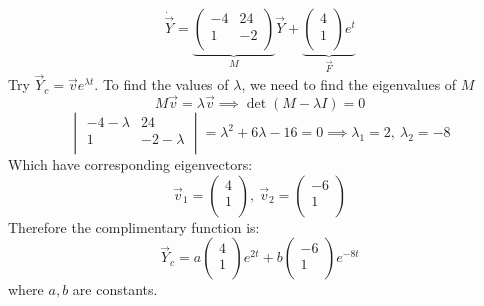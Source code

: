 \documentclass[../main.tex]{subfiles}
\begin{document}
\begin{example}
  \[
    \dot{\vec{Y}} = \underbrace{
      \begin{pmatrix}
        -4 & 24 \\
        1 & -2 \\
      \end{pmatrix}}_{M} \vec{Y} +
    \underbrace{
      \begin{pmatrix}
        4 \\
        1 \\
      \end{pmatrix}e^{t}}_{\vec{F}}
  \]
  Try $\vec{Y}_c = \vec{v} e^{\lambda t}$.
  To find the values of $\lambda$, we need to find the eigenvalues of $M$
  \[
    M \vec{v} = \lambda \vec{v} \implies \det (M -\lambda I) = 0
  \]
  \[
    \begin{vmatrix}
    -4 - \lambda & 24 \\
    1 &  -2 - \lambda \\
    \end{vmatrix} =
    \lambda^2 + 6\lambda - 16 = 0 \implies \lambda_1 = 2,\ \lambda_2 = -8
  \]
  Which have corresponding eigenvectors:
  \[
    \vec{v}_1 = \begin{pmatrix}
    4 \\
    1 \\
    \end{pmatrix},\
    \vec{v}_2 = \begin{pmatrix}
    -6 \\
    1 \\
    \end{pmatrix}
  \]
  Therefore the complimentary function is:
  \[
    \vec{Y}_c = a \begin{pmatrix}
    4 \\
    1 \\
    \end{pmatrix}e^{2t}
    + b \begin{pmatrix}
    -6 \\
    1 \\
    \end{pmatrix}e^{-8t}
  \]
  where $a, b$ are constants.


\end{example}
\end{document}
